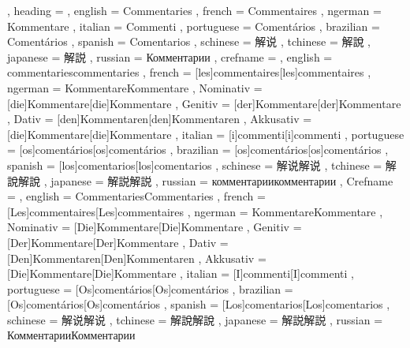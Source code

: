   {
    , heading =   {
                    , english     = Commentaries
                    , french      = Commentaires
                    , ngerman     = Kommentare
                    , italian     = Commenti
                    , portuguese  = Comentários
                    , brazilian   = Comentários
                    , spanish     = Comentarios
                    , schinese    = 解说
                    , tchinese    = 解說
                    , japanese    = 解説
                    , russian     = Комментарии
                  }
    , crefname =  {
                    , english     = {commentaries}{commentaries}
                    , french      = [les]{commentaires}[les]{commentaires}
                    , ngerman     = { {Kommentare}{Kommentare}
                                      , Nominativ = [die]{Kommentare}[die]{Kommentare}
                                      , Genitiv   = [der]{Kommentare}[der]{Kommentare}
                                      , Dativ     = [den]{Kommentaren}[den]{Kommentaren}
                                      , Akkusativ = [die]{Kommentare}[die]{Kommentare}
                                    }
                    , italian     = [i]{commenti}[i]{commenti}
                    , portuguese  = [os]{comentários}[os]{comentários}
                    , brazilian   = [os]{comentários}[os]{comentários}
                    , spanish     = [los]{comentarios}[los]{comentarios}
                    , schinese    = {解说}{解说}
                    , tchinese    = {解說}{解說}
                    , japanese    = {解説}{解説}
                    , russian     = {комментарии}{комментарии}
                  }
    , Crefname =  {
                    , english     = {Commentaries}{Commentaries}
                    , french      = [Les]{commentaires}[Les]{commentaires}
                    , ngerman     = { {Kommentare}{Kommentare}
                                      , Nominativ = [Die]{Kommentare}[Die]{Kommentare}
                                      , Genitiv   = [Der]{Kommentare}[Der]{Kommentare}
                                      , Dativ     = [Den]{Kommentaren}[Den]{Kommentaren}
                                      , Akkusativ = [Die]{Kommentare}[Die]{Kommentare}
                                    }
                    , italian     = [I]{commenti}[I]{commenti}
                    , portuguese  = [Os]{comentários}[Os]{comentários}
                    , brazilian   = [Os]{comentários}[Os]{comentários}
                    , spanish     = [Los]{comentarios}[Los]{comentarios}
                    , schinese    = {解说}{解说}
                    , tchinese    = {解說}{解說}
                    , japanese    = {解説}{解説}
                    , russian     = {Комментарии}{Комментарии}
                  }
  }


